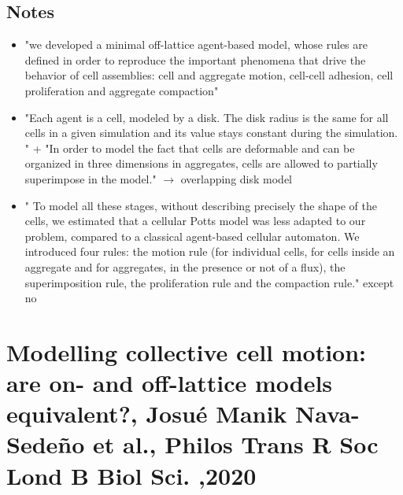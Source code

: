 \documentclass[11pt,a4paper]{article}
\begin{document}
\subsection*{Notes}
\begin{itemize}
\item "we developed a minimal off-lattice agent-based model, whose rules are defined in order to reproduce the important phenomena that drive the behavior of cell assemblies: cell and aggregate motion, cell-cell adhesion, cell proliferation and aggregate compaction"
\item "Each agent is a cell, modeled by a disk. The disk radius is the same for all cells in a given simulation and its value stays constant during the simulation. " + "In order to model the fact that cells are deformable and can be
organized in three dimensions in aggregates, cells are allowed to partially superimpose in the model." $\rightarrow$ overlapping disk model
\item " To model all these stages, without describing precisely the shape of the cells, we estimated that a cellular Potts model was less adapted to our problem, compared to a classical agent-based cellular automaton. We introduced four rules: the motion rule (for individual cells, for cells inside an aggregate and for aggregates, in the presence or not of a flux), the superimposition rule, the proliferation rule and the compaction rule." except no
\end{itemize}

\section*{Modelling collective cell motion: are on- and off-lattice models equivalent?, Josué Manik Nava-Sedeño et al., Philos Trans R Soc Lond B Biol Sci. ,2020}
\end{document}
